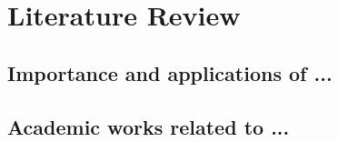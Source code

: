 \section{Literature Review}
\subsection{Importance and applications of ...}
\subsection{Academic works related to ...}
